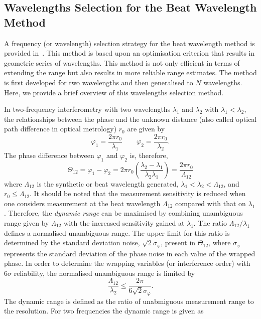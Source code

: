 \subsection{Wavelengths Selection for the Beat Wavelength Method}
A frequency (or wavelength) selection strategy for the beat wavelength method is provided in~\cite{Towers_frequency_selection_interferometry_2003}. This method is based upon an optimisation criterion that results in geometric series of wavelengths. This method is not only efficient in terms of extending the range but also results in more reliable range estimates. The method is first developed for two wavelengths and then generalised to $N$ wavelengths. Here, we provide a brief overview of this wavelengths selection method.

In two-frequency interferometry with two wavelengths $\lambda_1$ and $\lambda_2$ with $\lambda_1 < \lambda_2$, the relationships between the phase and the unknown distance (also called optical path difference in optical metrology) $r_0$ are given by
\[
\varphi_1 = \frac{2\pi r_0}{\lambda_1} \qquad \varphi_2 = \frac{2\pi r_0}{\lambda_2}.
\]
The phase difference between $\varphi_1$ and $\varphi_2$ is, therefore,
\[
\Theta_{12} = \varphi_1 - \varphi_2 = 2\pi r_0 \left(  \frac{\lambda_2 - \lambda_1}{\lambda_2\lambda_1}   \right)= \frac{2\pi r_0}{\Lambda_{12}}
\]
where $\Lambda_{12}$ is the synthetic or beat wavelength generated, $\lambda_1 < \lambda_2 <\Lambda_{12}$, and $r_0\leq \Lambda_{12}$. It should be noted that the measurement sensitivity is reduced when one considers measurement at the beat wavelength $\Lambda_{12}$ compared with that on $\lambda_1$. Therefore, the \emph{dynamic range} can be maximised by combining unambiguous range given by $\Lambda_{12}$ with the increased sensitivity gained at $\lambda_1$. The ratio $\Lambda_{12}/\lambda_1$ defines a normalised unambiguous range. The upper limit for this ratio is determined by the standard deviation noise, $\sqrt{2}\sigma_{\varphi}$, present in $\Theta_{12}$, where $\sigma_{\varphi}$ represents the standard deviation of the phase noise in each value of the wrapped phase. In order to determine the wrapping variables (or interference order) with $6\sigma$ reliability, the normalised unambiguous range is limited by~\cite{Towers_frequency_selection_interferometry_2003}
\begin{equation}\label{norml-range-2-freq}
\frac{\Lambda_{12}}{\lambda_2} \leq \dfrac{2 \pi}{6\sqrt{2}\sigma_{\varphi}}.
\end{equation}
The dynamic range is defined as the ratio of unabmiguous measurement range to the resolution. For two frequencies the dynamic range is given as~\cite{Towers_frequency_selection_interferometry_2003}
